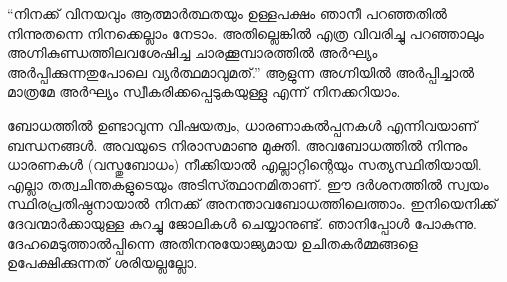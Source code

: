 “നിനക്ക് വിനയവും ആത്മാര്‍ത്ഥതയും ഉള്ളപക്ഷം ഞാനീ പറഞ്ഞതില്‍ നിന്നുതന്നെ നിനക്കെല്ലാം നേടാം. അതില്ലെങ്കില്‍ എത്ര വിവരിച്ചു പറഞ്ഞാലും അഗ്നികുണ്ഡത്തിലവശേഷിച്ച ചാരക്കൂമ്പാരത്തില്‍ അര്‍ഘ്യം അര്‍പ്പിക്കുന്നതുപോലെ വ്യര്‍ത്ഥമാവുമത്.” ആളുന്ന അഗ്നിയില്‍ അര്‍പ്പിച്ചാല്‍ മാത്രമേ അര്‍ഘ്യം സ്വീകരിക്കപ്പെടുകയുള്ളു എന്ന് നിനക്കറിയാം.

ബോധത്തില്‍ ഉണ്ടാവുന്ന വിഷയത്വം, ധാരണാകല്‍പ്പനകള്‍ എന്നിവയാണ് ബന്ധനങ്ങള്‍.  അവയുടെ നിരാസമാണു മുക്തി. അവബോധത്തില്‍ നിന്നും ധാരണകള്‍ (വസ്തുബോധം) നീക്കിയാല്‍ എല്ലാറ്റിന്റെയും സത്യസ്ഥിതിയായി. എല്ലാ തത്വചിന്തകളുടെയും അടിസ്ത്ഥാനമിതാണ്. ഈ ദര്‍ശനത്തില്‍ സ്വയം സ്ഥിരപ്രതിഷ്ഠനായാല്‍ നിനക്ക് അനന്താവബോധത്തിലെത്താം. ഇനിയെനിക്ക് ദേവന്മാര്‍ക്കായുള്ള കുറച്ചു ജോലികള്‍ ചെയ്യാനുണ്ട്. ഞാനിപ്പോള്‍ പോകുന്നു. ദേഹമെടുത്താല്‍പ്പിന്നെ അതിനനുയോജ്യമായ ഉചിതകര്‍മ്മങ്ങളെ ഉപേക്ഷിക്കുന്നത് ശരിയല്ലല്ലോ.
